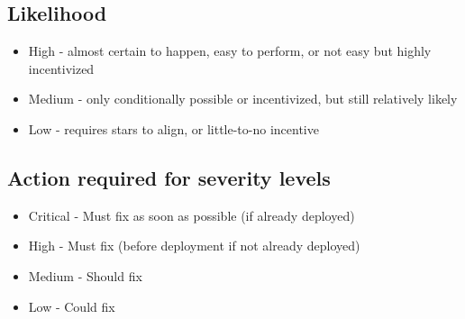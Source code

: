 \hypertarget{likelihood}{%
\subsection{Likelihood}\label{likelihood}}

\begin{itemize}
\tightlist
\item
  High - almost certain to happen, easy to perform, or not easy but
  highly incentivized
\item
  Medium - only conditionally possible or incentivized, but still
  relatively likely
\item
  Low - requires stars to align, or little-to-no incentive
\end{itemize}

\hypertarget{action-required-for-severity-levels}{%
\subsection{Action required for severity
levels}\label{action-required-for-severity-levels}}

\begin{itemize}
\tightlist
\item
  Critical - Must fix as soon as possible (if already deployed)
\item
  High - Must fix (before deployment if not already deployed)
\item
  Medium - Should fix
\item
  Low - Could fix
\end{itemize} 
